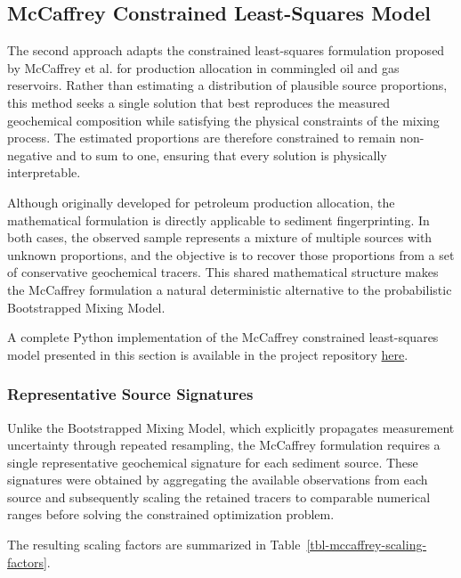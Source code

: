 \documentclass[
  12pt,
  letterpaper,
]{book}
\begin{document}
\subsection{McCaffrey Constrained Least-Squares
Model}\label{mccaffrey-constrained-least-squares-model}

The second approach adapts the constrained least-squares formulation
proposed by McCaffrey et al.
 for production
allocation in commingled oil and gas reservoirs. Rather than estimating
a distribution of plausible source proportions, this method seeks a
single solution that best reproduces the measured geochemical
composition while satisfying the physical constraints of the mixing
process. The estimated proportions are therefore constrained to remain
non-negative and to sum to one, ensuring that every solution is
physically interpretable.

Although originally developed for petroleum production allocation, the
mathematical formulation is directly applicable to sediment
fingerprinting. In both cases, the observed sample represents a mixture
of multiple sources with unknown proportions, and the objective is to
recover those proportions from a set of conservative geochemical
tracers. This shared mathematical structure makes the McCaffrey
formulation a natural deterministic alternative to the probabilistic
Bootstrapped Mixing Model.

A complete Python implementation of the McCaffrey constrained
least-squares model presented in this section is available in the
project repository
\href{https://github.com/rodrigokang/portfolio/tree/main/notebooks-and-scripts/5-climate-and-environmental-systems/1-sediment-source-modeling}{here}.

\subsubsection{Representative Source
Signatures}\label{representative-source-signatures}

Unlike the Bootstrapped Mixing Model, which explicitly propagates
measurement uncertainty through repeated resampling, the McCaffrey
formulation requires a single representative geochemical signature for
each sediment source. These signatures were obtained by aggregating the
available observations from each source and subsequently scaling the
retained tracers to comparable numerical ranges before solving the
constrained optimization problem.

The resulting scaling factors are summarized in
Table~\ref{tbl-mccaffrey-scaling-factors}.
\end{document}
